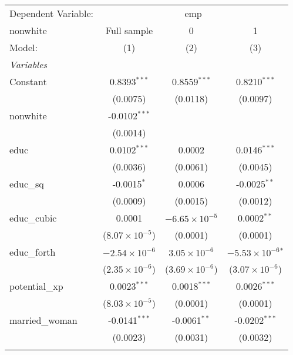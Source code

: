 \begingroup
\centering
\begin{tabular}{lccc}
   \tabularnewline \midrule \midrule
   Dependent Variable: & \multicolumn{3}{c}{emp}\\
   nonwhite        & Full sample             & 0                       & 1 \\   
   Model:          & (1)                     & (2)                     & (3)\\  
   \midrule
   \emph{Variables}\\
   Constant        & 0.8393$^{***}$          & 0.8559$^{***}$          & 0.8210$^{***}$\\   
                   & (0.0075)                & (0.0118)                & (0.0097)\\   
   nonwhite        & -0.0102$^{***}$         &                         &   \\   
                   & (0.0014)                &                         &   \\   
   educ            & 0.0102$^{***}$          & 0.0002                  & 0.0146$^{***}$\\   
                   & (0.0036)                & (0.0061)                & (0.0045)\\   
   educ\_sq        & -0.0015$^{*}$           & 0.0006                  & -0.0025$^{**}$\\   
                   & (0.0009)                & (0.0015)                & (0.0012)\\   
   educ\_cubic     & 0.0001                  & $-6.65\times 10^{-5}$   & 0.0002$^{**}$\\   
                   & ($8.07\times 10^{-5}$)  & (0.0001)                & (0.0001)\\   
   educ\_forth     & $-2.54\times 10^{-6}$   & $3.05\times 10^{-6}$    & $-5.53\times 10^{-6}$$^{*}$\\    
                   & ($2.35\times 10^{-6}$)  & ($3.69\times 10^{-6}$)  & ($3.07\times 10^{-6}$)\\    
   potential\_xp   & 0.0023$^{***}$          & 0.0018$^{***}$          & 0.0026$^{***}$\\   
                   & ($8.03\times 10^{-5}$)  & (0.0001)                & (0.0001)\\   
   married\_woman  & -0.0141$^{***}$         & -0.0061$^{**}$          & -0.0202$^{***}$\\   
                   & (0.0023)                & (0.0031)                & (0.0032)\\   
$$
\end{tabular}

